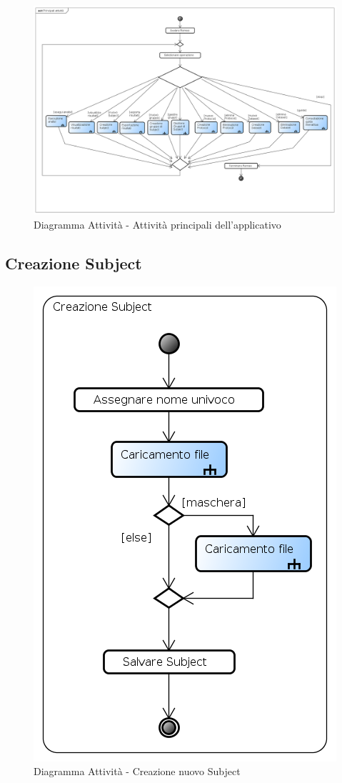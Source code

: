 \begin{landscape}
\begin{figure}[!h]
	\centering
	\includegraphics[scale=0.5]{./img/Diagrammi_Attivita/Principali_attivita}
	\caption{Diagramma Attività - Attività principali dell'applicativo \project{}}
	\label{generale}
\end{figure}
\end{landscape}
\pagebreak

\subsection{Creazione Subject}
\label{newSub}
\begin{figure}[!h]
	\centering
	\includegraphics[scale=0.6]{./img/Diagrammi_Attivita/Creazione_Subject}
	\caption{Diagramma Attività - Creazione nuovo Subject}
	\label{newS}
\end{figure}
